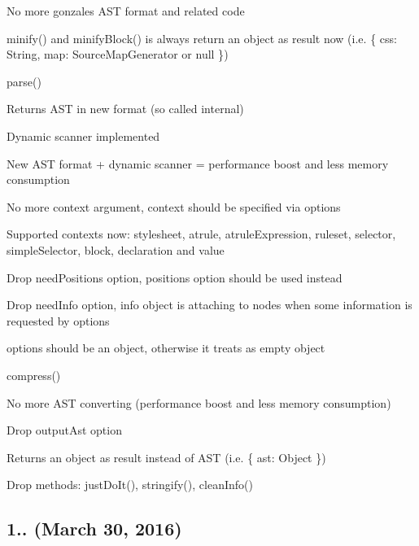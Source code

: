 \begin{DoxyItemize}
\item No more {\ttfamily gonzales} A\+ST format and related code
\item {\ttfamily minify()} and {\ttfamily minify\+Block()} is always return an object as result now (i.\+e. {\ttfamily \{ css\+: String, map\+: Source\+Map\+Generator or null \}})
\item {\ttfamily parse()}
\begin{DoxyItemize}
\item Returns A\+ST in new format (so called {\ttfamily internal})
\item Dynamic scanner implemented
\item New A\+ST format + dynamic scanner = performance boost and less memory consumption
\item No more {\ttfamily context} argument, context should be specified via {\ttfamily options}
\item Supported contexts now\+: {\ttfamily stylesheet}, {\ttfamily atrule}, {\ttfamily atrule\+Expression}, {\ttfamily ruleset}, {\ttfamily selector}, {\ttfamily simple\+Selector}, {\ttfamily block}, {\ttfamily declaration} and {\ttfamily value}
\item Drop {\ttfamily need\+Positions} option, {\ttfamily positions} option should be used instead
\item Drop {\ttfamily need\+Info} option, {\ttfamily info} object is attaching to nodes when some information is requested by {\ttfamily options}
\item {\ttfamily options} should be an object, otherwise it treats as empty object
\end{DoxyItemize}
\item {\ttfamily compress()}
\begin{DoxyItemize}
\item No more A\+ST converting (performance boost and less memory consumption)
\item Drop {\ttfamily output\+Ast} option
\item Returns an object as result instead of A\+ST (i.\+e. {\ttfamily \{ ast\+: Object \}})
\end{DoxyItemize}
\item Drop methods\+: {\ttfamily just\+Do\+It()}, {\ttfamily stringify()}, {\ttfamily clean\+Info()}
\end{DoxyItemize}

\subsection*{1.. (March 30, 2016)}


